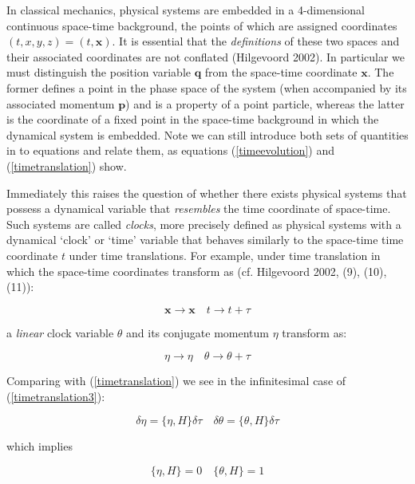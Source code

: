 \documentclass{article}
\begin{document}
In classical mechanics, physical systems are embedded in a 4-dimensional continuous space-time background, the points of which are assigned coordinates $(t,x,y,z) = (t, \boldsymbol{x})$.
It is essential that the \textit{definitions} of these two spaces and their associated coordinates are not conflated (Hilgevoord 2002). In particular we must distinguish the position variable $\boldsymbol{q}$ from the space-time coordinate $\boldsymbol{x}$. The former defines a point in the phase space of the system (when accompanied by its associated momentum $\boldsymbol{p}$) and is a property of a point particle, whereas the latter is the coordinate of a fixed point in the space-time background in which the dynamical system is embedded. Note we can still introduce both sets of quantities in to equations and relate them, as equations (\ref{timeevolution}) and (\ref{timetranslation}) show.

Immediately this raises the question of whether there exists physical systems that possess a dynamical variable that \textit{resembles} the time coordinate of space-time. Such systems are called \textit{clocks}, more precisely defined as physical systems with a dynamical `clock' or `time' variable that behaves similarly to the space-time time coordinate $t$ under time translations. For example, under time translation in which the space-time coordinates transform as (cf. Hilgevoord 2002, (9), (10), (11)):

\begin{equation}
\boldsymbol{x} \rightarrow \boldsymbol{x} \quad t \rightarrow t+\tau
\label{timetranslation2}
\end{equation}

\noindent a \textit{linear} clock variable $\theta$ and its conjugate momentum $\eta$ transform as:

\begin{equation}
	\eta \rightarrow \eta \quad \theta \rightarrow \theta + \tau
	\label{timetranslation3}
\end{equation}

\noindent Comparing with (\ref{timetranslation}) we see in the infinitesimal case of (\ref{timetranslation3}):

\begin{equation}
	\delta\eta=\{\eta, H\}\delta\tau \quad \delta\theta = \{\theta, H\}\delta\tau
	\label{timetranslation4}
\end{equation}

\noindent which implies

\begin{equation}
	\{\eta, H\}=0 \quad \{\theta, H\}=1
	\label{timetranslation5}
\end{equation}
\end{document}
